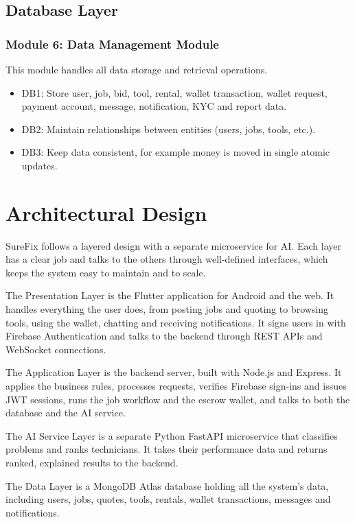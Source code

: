 \documentclass[A4paper,12pt]{report}
\theoremstyle{plain}
\theoremstyle{definition}
\theoremstyle{remark}
\numberwithin{equation}{section}
\begin{document}
\subsection{Database Layer}

\subsubsection{Module 6: Data Management Module}

This module handles all data storage and retrieval operations.

\begin{itemize}
        \item DB1: Store user, job, bid, tool, rental, wallet transaction, wallet request, payment account, message, notification, KYC and report data.
    \item DB2: Maintain relationships between entities (users, jobs, tools, etc.).
    \item DB3: Keep data consistent, for example money is moved in single atomic updates.
\end{itemize}


\section{Architectural Design}
SureFix follows a layered design with a separate microservice for AI. Each layer has a clear job and talks to the others through well-defined interfaces, which keeps the system easy to maintain and to scale.

The Presentation Layer is the Flutter application for Android and the web. It handles everything the user does, from posting jobs and quoting to browsing tools, using the wallet, chatting and receiving notifications. It signs users in with Firebase Authentication and talks to the backend through REST APIs and WebSocket connections.

The Application Layer is the backend server, built with Node.js and Express. It applies the business rules, processes requests, verifies Firebase sign-ins and issues JWT sessions, runs the job workflow and the escrow wallet, and talks to both the database and the AI service.

The AI Service Layer is a separate Python FastAPI microservice that classifies problems and ranks technicians. It takes their performance data and returns ranked, explained results to the backend.

The Data Layer is a MongoDB Atlas database holding all the system's data, including users, jobs, quotes, tools, rentals, wallet transactions, messages and notifications.
\end{document}
